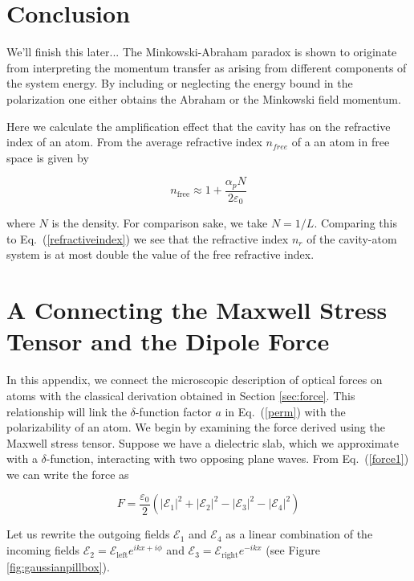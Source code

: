 \documentclass[twocolumn,english,pra,aps,superscriptaddress,floatfix]{revtex4-1}
\begin{document}
\section{Conclusion}
\label{sec:conclusion}

We'll finish this later...
The Minkowski-Abraham paradox is shown to originate from interpreting the momentum transfer as arising from different components of the system energy. By including or neglecting the energy bound in the polarization one either obtains the Abraham or the Minkowski field momentum.  
  
Here we calculate the amplification effect that the cavity has on the refractive index of an atom.  From \cite{cohentannoudji} the average refractive index $n_{free}$ of a an atom in free space is given by

\begin{equation}
n_{\mathrm{free}}\approx 1+\frac{\alpha_{p}N}{2\varepsilon_{0}}
\end{equation}

where $N$ is the density.  For comparison sake, we take $N=1/L$.  Comparing this to Eq.\ (\ref{refractiveindex}) we see that the refractive index $n_{r}$ of the cavity-atom system is at most double the value of the free refractive index. 

\section{A Connecting the Maxwell Stress Tensor and the Dipole Force}
\label{sec:AppendixAMaxwellvsQOforce}


In this appendix, we connect the microscopic description of optical forces on atoms \cite{cohentannoudji} with the classical derivation obtained in Section \ref{sec:force}.  
This relationship will link the $\delta$-function factor $a$ in Eq.\ (\ref{perm}) with the polarizability of an atom. We begin by examining the force 
derived using the Maxwell stress tensor.  Suppose we have a dielectric slab, which we approximate with a $\delta$-function, interacting with two opposing plane waves. 
From Eq.\ (\ref{force1}) we can write the force as

\begin{equation}
F=\frac{\varepsilon_{0}}{2}\left(\left|\mathcal{E}_{1}\right|^{2}+\left|\mathcal{E}_{2}\right|^{2}-\left|\mathcal{E}_{3}\right|^{2}-\left|\mathcal{E}_{4}\right|^{2}\right)
\label{Gaussianforce}
\end{equation}

Let us rewrite the outgoing fields $\mathcal{E}_{1}$ and $\mathcal{E}_{4}$ as a linear combination of the incoming fields $\mathcal{E}_{2}=\mathcal{E}_{\mathrm{left}}e^{ikx+i\phi}$ 
and $\mathcal{E}_{3}=\mathcal{E}_{\mathrm{right}}e^{-ikx}$ (see Figure \ref{fig:gaussianpillbox}).
\end{document}
